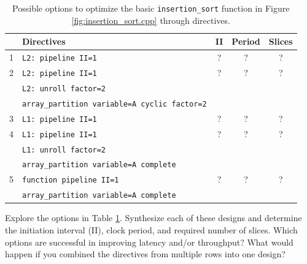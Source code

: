 \begin{table}[htbp]
  \centering
  \caption{Possible options to optimize the basic \lstinline{insertion_sort} function in Figure \ref{fig:insertion_sort.cpp} through directives.}
  \label{tbl:sw_insertionsort_vs_hardwareA}
	\tabcolsep=0.2cm
	 \centering %
	 \begin{tabularx}{400pt}{cXccc}
    \toprule
     & Directives & II &  Period & Slices   \\
    \midrule
1 & \lstinline|L2: pipeline II=1|  & ? & ? & ?  \\ \midrule
2 & \lstinline|L2: pipeline II=1|& ?  & ? & ?   \\
 &\lstinline|L2: unroll factor=2|&&&\\
 &\lstinline|array_partition variable=A cyclic factor=2| &&&\\ \midrule
3 & \lstinline|L1: pipeline II=1| & ? & ? & ?      \\ \midrule
4 & \lstinline|L1: pipeline II=1| & ?  & ? & ?   \\
& \lstinline|L1: unroll factor=2| &&&\\
& \lstinline|array_partition variable=A complete| &&& \\ \midrule
5 & \lstinline|function pipeline II=1| & ? & ? & ?     \\
& \lstinline|array_partition variable=A complete| &&& \\ 
    \bottomrule
    \end{tabularx}
  \label{table:case-studies}
\end{table}

\begin{exercise}
Explore the options in Table \ref{table:case-studies}.  Synthesize each of these designs and determine the initiation interval (II), clock period, and required number of slices.  Which options are successful in improving latency and/or throughput?  What would happen if you combined the directives from multiple rows into one design?
\end{exercise}

